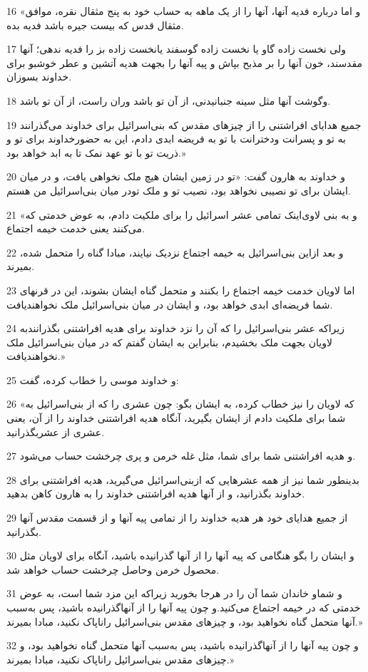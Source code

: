 \par 16 «و اما درباره فدیه آنها، آنها را از یک ماهه به حساب خود به پنج مثقال نقره، موافق مثقال قدس که بیست جیره باشد فدیه بده.
\par 17 ولی نخست زاده گاو یا نخست زاده گوسفند یانخست زاده بز را فدیه ندهی؛ آنها مقدسند، خون آنها را بر مذبح بپاش و پیه آنها را بجهت هدیه آتشین و عطر خوشبو برای خداوند بسوزان.
\par 18 وگوشت آنها مثل سینه جنبانیدنی، از آن تو باشد وران راست، از آن تو باشد.
\par 19 جمیع هدایای افراشتنی را از چیزهای مقدس که بنی‌اسرائیل برای خداوند می‌گذرانند به تو و پسرانت ودخترانت با تو به فریضه ابدی دادم، این به حضورخداوند برای تو و ذریت تو با تو عهد نمک تا به ابد خواهد بود.»
\par 20 و خداوند به هارون گفت: «تو در زمین ایشان هیچ ملک نخواهی یافت، و در میان ایشان برای تو نصیبی نخواهد بود، نصیب تو و ملک تودر میان بنی‌اسرائیل من هستم.
\par 21 «و به بنی لاوی‌اینک تمامی عشر اسرائیل را برای ملکیت دادم، به عوض خدمتی که می‌کنند یعنی خدمت خیمه اجتماع.
\par 22 و بعد ازاین بنی‌اسرائیل به خیمه اجتماع نزدیک نیایند، مبادا گناه را متحمل شده، بمیرند.
\par 23 اما لاویان خدمت خیمه اجتماع را بکنند و متحمل گناه ایشان بشوند، این در قرنهای شما فریضه‌ای ابدی خواهد بود، و ایشان در میان بنی‌اسرائیل ملک نخواهندیافت.
\par 24 زیراکه عشر بنی‌اسرائیل را که آن را نزد خداوند برای هدیه افراشتنی بگذرانندبه لاویان بجهت ملک بخشیدم، بنابراین به ایشان گفتم که در میان بنی‌اسرائیل ملک نخواهندیافت.»
\par 25 و خداوند موسی را خطاب کرده، گفت:
\par 26 «که لاویان را نیز خطاب کرده، به ایشان بگو: چون عشری را که از بنی‌اسرائیل به شما برای ملکیت دادم از ایشان بگیرید، آنگاه هدیه افراشتنی خداوند را از آن، یعنی عشری از عشربگذرانید.
\par 27 و هدیه افراشتنی شما برای شما، مثل غله خرمن و پری چرخشت حساب می‌شود.
\par 28 بدینطور شما نیز از همه عشرهایی که ازبنی‌اسرائیل می‌گیرید، هدیه افراشتنی برای خداوند بگذرانید، و از آنها هدیه افراشتنی خداوند را به هارون کاهن بدهید.
\par 29 از جمیع هدایای خود هر هدیه خداوند را از تمامی پیه آنها و از قسمت مقدس آنها بگذرانید.
\par 30 و ایشان را بگو هنگامی که پیه آنها را از آنها گذرانیده باشید، آنگاه برای لاویان مثل محصول خرمن وحاصل چرخشت حساب خواهد شد.
\par 31 و شماو خاندان شما آن را در هرجا بخورید زیراکه این مزد شما است، به عوض خدمتی که در خیمه اجتماع می‌کنید.و چون پیه آنها را از آنهاگذرانیده باشید، پس به‌سبب آنها متحمل گناه نخواهید بود، و چیزهای مقدس بنی‌اسرائیل راناپاک نکنید، مبادا بمیرند.»
\par 32 و چون پیه آنها را از آنهاگذرانیده باشید، پس به‌سبب آنها متحمل گناه نخواهید بود، و چیزهای مقدس بنی‌اسرائیل راناپاک نکنید، مبادا بمیرند.»
 
